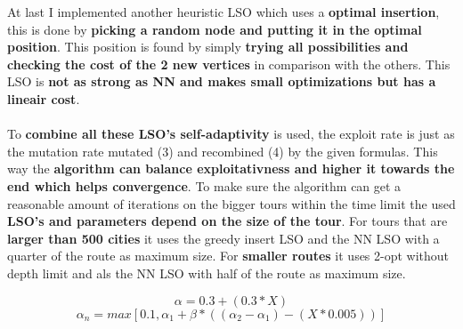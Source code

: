 \documentclass[a4paper,10pt]{article}
\begin{document}
At last I implemented another heuristic LSO which uses a \textbf{optimal insertion}, this is done by \textbf{picking a random node and putting it in the optimal position}. This position is found by simply \textbf{trying all possibilities and checking the cost of the 2 new vertices} in comparison with the others. This LSO is \textbf{not as strong as NN and makes small optimizations but has a lineair cost}.
\\\\
To \textbf{combine all these LSO's self-adaptivity} is used, the exploit rate is just as the mutation rate mutated (3) and recombined (4) by the given formulas. This way the \textbf{algorithm can balance exploitativness and higher it towards the end which helps convergence}. To make sure the algorithm can get a reasonable amount of iterations on the bigger tours within the time limit the used \textbf{LSO's and parameters depend on the size of the tour}. For tours that are \textbf{larger than 500 cities} it uses the greedy insert LSO and the NN LSO with a quarter of the route as maximum size. For \textbf{smaller routes} it uses 2-opt without depth limit and als the NN LSO with half of the route as maximum size.

\begin{equation}
	\alpha = 0.3 + (0.3 * X)
\end{equation}
\begin{equation}
	\alpha_n = max[0.1, \alpha_1 + \beta * ((\alpha_2 - \alpha_1) - (X*0.005))]
\end{equation}
\end{document}
